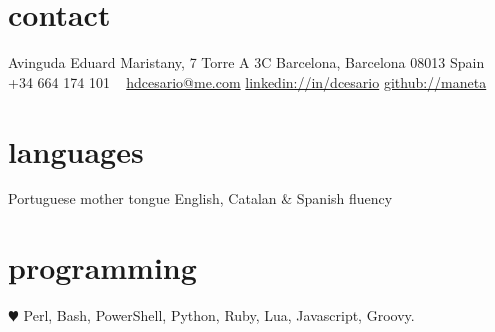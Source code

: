 \documentclass[]{friggeri-cv} %
\begin{document}


\begin{aside} %
\section{contact}
Avinguda Eduard Maristany, 7 Torre A 3C
Barcelona, Barcelona 08013
Spain
~
+34 664 174 101
~
\href{mailto:hdcesario@me.com}{hdcesario@me.com}
\href{http://es.linkedin.com/in/dcesario/}{linkedin://in/dcesario}
\href{https://github.com/maneta}{github://maneta}
\section{languages}
Portuguese mother tongue
English, Catalan \& Spanish fluency
\section{programming}
{\color{red} $\varheartsuit$} Perl, Bash, PowerShell, Python, Ruby, Lua, Javascript, Groovy. 
\end{aside}

\end{document}
